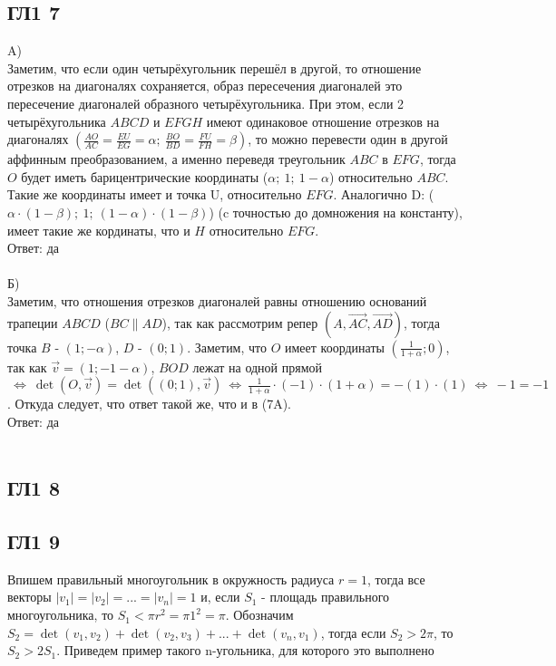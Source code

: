 	\subsection{ГЛ1 7}
		A)\\
		Заметим, что если один четырёхугольник перешёл в другой, то отношение отрезков на диагоналях сохраняется, образ пересечения диагоналей это пересечение диагоналей образного четырёхугольника. При этом, если 2 четырёхугольника $ABCD$ и $EFGH$ имеют одинаковое отношение отрезков на диагоналях $(\frac{AO}{AC} = \frac{EU}{EG} = \alpha; \: \frac{BO}{BD} = \frac{FU}{FH} = \beta)$, то можно перевести один в другой аффинным преобразованием, а именно переведя треугольник $ABC$ в $EFG$, тогда $O$ будет иметь барицентрические координаты ($\alpha; \: 1; \: 1 - \alpha$) относительно $ABC$. Такие же координаты имеет и точка U, относительно $EFG$. Аналогично D: ($\alpha \cdot (1 - \beta); \: 1; \: (1 - \alpha) \cdot (1 - \beta)$) (c точностью до домножения на константу), имеет такие же кординаты, что и $H$ относительно $EFG$.\\
		Ответ: да\\
		\\
		Б)\\
		Заметим, что отношения отрезков диагоналей равны отношению оснований трапеции $ABCD$ ($BC \parallel AD$), так как рассмотрим репер $(A, \overrightarrow{AC}, \overrightarrow{AD})$, тогда точка $B$ - $(1; -\alpha)$, $D$ - $(0;1)$. Заметим, что $O$ имеет координаты $(\frac{1}{1 + \alpha};0)$, так как $\overrightarrow{v} = (1; - 1 - \alpha)$, $BOD$ лежат на одной прямой $\: \Leftrightarrow \: \det(O, \overrightarrow{v}) = \det((0;1), \overrightarrow{v}) \: \Leftrightarrow \: \frac{1}{1 + \alpha} \cdot (-1) \cdot (1 + \alpha) = -(1) \cdot (1) \: \Leftrightarrow \: -1 = -1$. Откуда следует, что ответ такой же, что и в (7A).\\
		Ответ: да\\
		\\
		
		\subsection{ГЛ1 8}
		
		\subsection{ГЛ1 9}
		Впишем правильный многоугольник в окружность радиуса $r = 1$, тогда все векторы $|v_1| = |v_2| = ... = |v_n| = 1$ и, если $S_1$ - площадь правильного многоугольника, то $S_1 < \pi r^2 = \pi 1^2 = \pi$. Обозначим $S_2 = \det(v_1, v_2) + \det(v_2, v_3) + ... + \det(v_n, v_1)$, тогда если $S_2 > 2\pi$, то $S_2 > 2S_1$. Приведем пример такого n-угольника, для которого это выполнено
		
